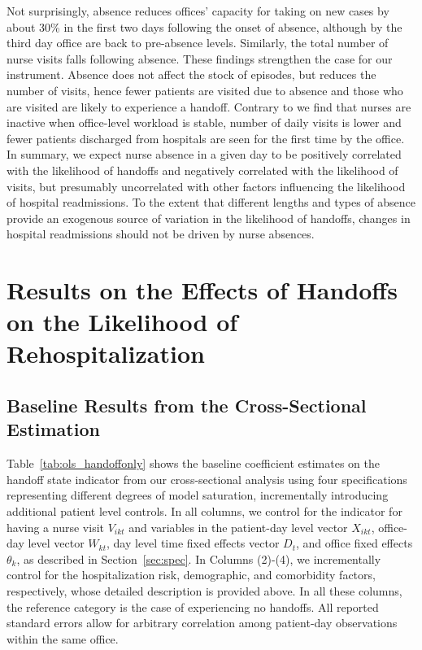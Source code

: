 \documentclass[final,12pt, notitlepage]{article}
\begin{document}
Not surprisingly, absence reduces offices' capacity for taking on new cases by about 30\% in the first two days following the onset of absence, although by the third day office are back to pre-absence levels. Similarly, the total number of nurse visits falls following absence. These findings strengthen the case for our instrument. Absence does not affect the stock of episodes, but reduces the number of visits, hence fewer patients are visited due to absence and those who are visited are likely to experience a handoff. Contrary to \citet{Green2013} we find that nurses are inactive when office-level workload is stable, number of daily visits is lower and fewer patients discharged from hospitals are seen for the first time by the office. In summary, we expect nurse absence in a given day to be positively correlated with the likelihood of handoffs and negatively correlated with the likelihood of visits, but presumably uncorrelated with other factors influencing the likelihood of hospital readmissions. To the extent that different lengths and types of absence provide an exogenous source of variation in the likelihood of handoffs, changes in hospital readmissions should not be driven by nurse absences.


\section{Results on the Effects of Handoffs on the Likelihood of Rehospitalization}
\label{sec:results}

\subsection{Baseline Results from the Cross-Sectional Estimation} \label{sec:ols}


Table~\ref{tab:ols_handoffonly} shows the baseline coefficient estimates on the handoff state indicator from our cross-sectional analysis using four specifications representing different degrees of model saturation, incrementally introducing additional patient level controls.
In all columns, we control for the indicator for having a nurse visit $V_{ikt}$ and variables in the patient-day level vector $X_{ikt}$, office-day level vector $W_{kt}$, day level time fixed effects vector $D_t$, and office fixed effects $\theta_k$, as described in Section~\ref{sec:spec}.
In Columns (2)-(4), we incrementally control for the hospitalization risk, demographic, and comorbidity factors, respectively, whose detailed description is provided above.
In all these columns, the reference category is the case of experiencing no handoffs. All reported standard errors allow for arbitrary correlation among patient-day observations within the same office.
\end{document}
